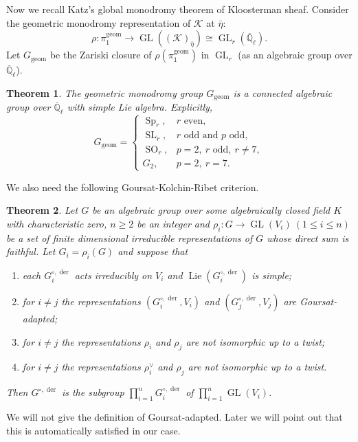 \documentclass[11pt]{amsart}
\newtheorem{theorem}{Theorem}[section]
\theoremstyle{remark}
\newcommand{\Ql}{\overline{\mathbb Q}_{\ell}}
\newcommand{\cK}{\mathcal K}
\newcommand{\geom}{\mathrm{geom}}
\def\GL{\operatorname{GL}}
\def\der{\operatorname{der}}
\def\Lie{\operatorname{Lie}}
\begin{document}
Now we recall Katz's global monodromy theorem of Kloosterman sheaf. Consider the geometric monodromy representation of $\cK$ at $\bar{\eta}$:
\[
\rho: \pi_1^{\geom}\longrightarrow \GL((\cK)_{\bar{\eta}})\cong\GL_r(\Ql).
\]
Let $G_{\geom}$ be the Zariski closure of $\rho(\pi_1^{\geom})$ in $\GL_r$ (as an algebraic group over $\Ql$).

\begin{theorem}\cite[Theorem 11.1]{KatzGKM}\label{global monodromy}
The geometric monodromy group $G_\geom$ is a connected algebraic group over $\Ql$ with simple Lie algebra. Explicitly,
\[
G_\geom=
\begin{cases}
\operatorname{Sp}_r, & r\text{ even},\\
\operatorname{SL}_r, & r\text{ odd and }p\text{ odd},\\
\operatorname{SO}_r, & p=2,\ r\text{ odd},\ r\ne 7,\\
G_2, & p=2,\ r=7.
\end{cases}
\]
\end{theorem}

We also need the following Goursat-Kolchin-Ribet criterion.
\begin{theorem}\cite[Proposition~1.8.2]{KatzESDE}\label{GKR}
Let $G$ be an algebraic group over some algebraically closed field $K$ with characteristic zero, $n\ge 2$ be an integer and $\rho_i:G\rightarrow\GL(V_i)~(1\le i\le n)$ be a set of finite dimensional irreducible representations of $G$ whose direct sum is faithful. Let $G_i=\rho_i(G)$ and suppose that
\begin{enumerate}[label=(\alph*)]
\item each $G_i^{\circ,\der}$ acts irreducibly on $V_i$ and $\Lie(G_i^{\circ,\der})$ is simple;
\item for $i\ne j$ the representations $(G_i^{\circ,\der},V_i)$ and $(G_j^{\circ,\der},V_j)$ are Goursat-adapted;
\item for $i\ne j$ the representations $\rho_i$ and $\rho_j$ are not isomorphic up to a twist;
\item for $i\ne j$ the representations $\rho_i^\vee$ and $\rho_j$ are not isomorphic up to a twist.
\end{enumerate}
Then $G^{\circ,\der}$ is the subgroup $\prod_{i=1}^n G_i^{\circ,\der}$ of $\prod_{i=1}^n\GL(V_i)$.
\end{theorem}

We will not give the definition of Goursat-adapted. Later we will point out that this is automatically satisfied in our case.
\end{document}
